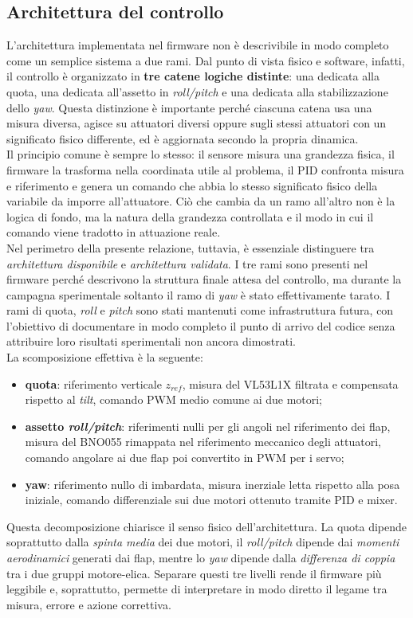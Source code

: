 \documentclass[11pt]{report}
\begin{document}
	\subsection{Architettura del controllo}
	L'architettura implementata nel firmware non è descrivibile in modo completo come un semplice sistema a due rami. Dal punto di vista fisico e software, infatti, il controllo è organizzato in \textbf{tre catene logiche distinte}: una dedicata alla quota, una dedicata all'assetto in \textit{roll/pitch} e una dedicata alla stabilizzazione dello \textit{yaw}. Questa distinzione è importante perché ciascuna catena usa una misura diversa, agisce su attuatori diversi oppure sugli stessi attuatori con un significato fisico differente, ed è aggiornata secondo la propria dinamica.\\
	Il principio comune è sempre lo stesso: il sensore misura una grandezza fisica, il firmware la trasforma nella coordinata utile al problema, il PID confronta misura e riferimento e genera un comando che abbia lo stesso significato fisico della variabile da imporre all'attuatore. Ciò che cambia da un ramo all'altro non è la logica di fondo, ma la natura della grandezza controllata e il modo in cui il comando viene tradotto in attuazione reale.\\
	Nel perimetro della presente relazione, tuttavia, è essenziale distinguere tra \textit{architettura disponibile} e \textit{architettura validata}. I tre rami sono presenti nel firmware perché descrivono la struttura finale attesa del controllo, ma durante la campagna sperimentale soltanto il ramo di \textit{yaw} è stato effettivamente tarato. I rami di quota, \textit{roll} e \textit{pitch} sono stati mantenuti come infrastruttura futura, con l'obiettivo di documentare in modo completo il punto di arrivo del codice senza attribuire loro risultati sperimentali non ancora dimostrati.\\
	La scomposizione effettiva è la seguente:
	\begin{itemize}
		\item \textbf{quota}: riferimento verticale $z_{ref}$, misura del VL53L1X filtrata e compensata rispetto al \textit{tilt}, comando PWM medio comune ai due motori;
		\item \textbf{assetto \textit{roll/pitch}}: riferimenti nulli per gli angoli nel riferimento dei flap, misura del BNO055 rimappata nel riferimento meccanico degli attuatori, comando angolare ai due flap poi convertito in PWM per i servo;
		\item \textbf{yaw}: riferimento nullo di imbardata, misura inerziale letta rispetto alla posa iniziale, comando differenziale sui due motori ottenuto tramite PID e mixer.
	\end{itemize}
	Questa decomposizione chiarisce il senso fisico dell'architettura. La quota dipende soprattutto dalla \emph{spinta media} dei due motori, il \textit{roll/pitch} dipende dai \emph{momenti aerodinamici} generati dai flap, mentre lo \textit{yaw} dipende dalla \emph{differenza di coppia} tra i due gruppi motore-elica. Separare questi tre livelli rende il firmware più leggibile e, soprattutto, permette di interpretare in modo diretto il legame tra misura, errore e azione correttiva.
\end{document}
